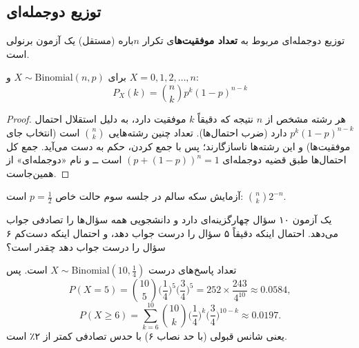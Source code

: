 \subsection{توزیع دوجمله‌ای }
توزیع دوجمله‌ای مربوط به \textbf{تعداد موفقیت‌ها}ی تکرار $n$باره (مستقل) یک آزمون برنولی است.

\begin{theorem}
برای $X\sim\mathrm{Binomial}(n,p)$ و $X=0,1,2,\ldots,n$:
\[
\boxed{\ P_X(k)=\binom nk p^k(1-p)^{n-k}\ }
\]
\end{theorem}
\begin{proof}
هر رشته مشخص از $n$ نتیجه که دقیقاً $k$ موفقیت دارد، به دلیل استقلال احتمال $p^k(1-p)^{n-k}$ دارد (ضرب احتمال‌ها). تعداد چنین رشته‌هایی $\binom nk$ است (انتخاب جای موفقیت‌ها) و این رشته‌ها ناسازگارند؛ پس با جمع کردن، حکم به دست می‌آید. جمع کل احتمال‌ها طبق قضیه دوجمله‌ای $(p+(1-p))^n=1$ است ــ و نام «دوجمله‌ای» از همین‌جاست.
\end{proof}

\begin{note}
\notetitle آزمایش سکه سالم در جلسه سوم حالت خاص $p=\frac12$ است: $\binom nk2^{-n}$.
\end{note}

\begin{center}
\end{center}

\begin{example}
یک آزمون ۱۰ سؤال چهارگزینه‌ای دارد و دانشجویی همه سؤال‌ها را تصادفی جواب می‌دهد. احتمال اینکه دقیقاً ۵ سؤال را درست جواب دهد، و احتمال اینکه دست‌کم ۶ سؤال را درست جواب دهد چقدر است؟
\begin{solution}
تعداد پاسخ‌های درست $X\sim\mathrm{Binomial}(10,\frac14)$ است. پس
\[
P(X=5)=\binom{10}{5}\Big(\frac14\Big)^5\Big(\frac34\Big)^5=252\times\frac{243}{4^{10}}\approx0.0584,
\]
\[
P(X\ge6)=\sum_{k=6}^{10}\binom{10}{k}\Big(\frac14\Big)^k\Big(\frac34\Big)^{10-k}\approx0.0197 .
\]
یعنی شانس قبولی (با حد نصاب ۶) با حدس تصادفی کمتر از ۲٪ است.
\end{solution}
\end{example}

